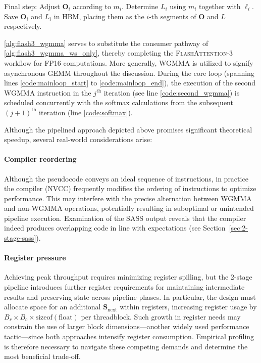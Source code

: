\begin{enumerate}
\begin{algorithm}[H]
\begin{algorithmic}[1]
\STATE Final step: Adjust $\mathbf{O}_{i}$ according to $m_{i}$. Determine $L_{i}$ using $m_{i}$ together with $\ell_{i}$.
Save $\mathbf{O}_{i}$ and $L_{i}$ in HBM, placing them as the $i$-th segments of $\mathbf{O}$ and $L$ respectively.
\end{algorithmic}
\end{algorithm}

\cref{alg:flash3_wgmma} serves to substitute the consumer pathway of \cref{alg:flash3_wgmma_ws_only}, thereby completing the \textsc{FlashAttention-3} workflow for FP16 computations. More generally, WGMMA is utilized to signify asynchronous GEMM throughout the discussion. During the core loop (spanning lines \ref{code:mainloop_start} to \ref{code:mainloop_end}), the execution of the second WGMMA instruction in the $j^{\text{th}}$ iteration (see line \ref{code:second_wgmma}) is scheduled concurrently with the softmax calculations from the subsequent $(j+1)^{\text{th}}$ iteration (line \ref{code:softmax}).

Although the pipelined approach depicted above promises significant theoretical speedup, several real-world considerations arise:

\paragraph{Compiler reordering} Although the pseudocode conveys an ideal sequence of instructions, in practice the compiler (NVCC) frequently modifies the ordering of instructions to optimize performance. This may interfere with the precise alternation between WGMMA and non-WGMMA operations, potentially resulting in suboptimal or unintended pipeline execution. Examination of the SASS output reveals that the compiler indeed produces overlapping code in line with expectations (see Section~\ref{sec:2-stage-sass}).

\paragraph{Register pressure} Achieving peak throughput requires minimizing register spilling, but the 2-stage pipeline introduces further register requirements for maintaining intermediate results and preserving state across pipeline phases. In particular, the design must allocate space for an additional $\mathbf{S}_{\mathrm{next}}$ within registers, increasing register usage by $B_r \times B_c \times \text{sizeof}(\text{float})$ per threadblock. Such growth in register needs may constrain the use of larger block dimensions—another widely used performance tactic—since both approaches intensify register consumption. Empirical profiling is therefore necessary to navigate these competing demands and determine the most beneficial trade-off.


\end{enumerate}
